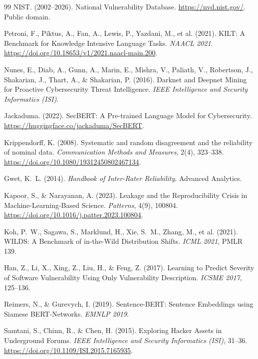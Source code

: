 \documentclass{article}
\begin{document}
\begin{thebibliography}{99}
NIST. (2002--2026). National Vulnerability Database.
\url{https://nvd.nist.gov/}. Public domain.

Petroni, F., Piktus, A., Fan, A., Lewis, P., Yazdani, M., et al.
(2021). KILT: A Benchmark for Knowledge Intensive Language Tasks.
\textit{NAACL 2021}. \url{https://doi.org/10.18653/v1/2021.naacl-main.200}.

Nunes, E., Diab, A., Gunn, A., Marin, E., Mishra, V.,
Paliath, V., Robertson, J., Shakarian, J., Thart, A., \&
Shakarian, P. (2016). Darknet and Deepnet Mining for Proactive
Cybersecurity Threat Intelligence. \textit{IEEE Intelligence and
Security Informatics (ISI)}.

Jackaduma. (2022). SecBERT: A Pre-trained Language Model
for Cybersecurity. \url{https://huggingface.co/jackaduma/SecBERT}.

Krippendorff, K. (2008). Systematic and random disagreement and the
reliability of nominal data. \textit{Communication Methods and Measures},
2(4), 323--338. \url{https://doi.org/10.1080/19312450802467134}.

Gwet, K.\ L. (2014). \textit{Handbook of Inter-Rater Reliability}.
Advanced Analytics.

Kapoor, S., \& Narayanan, A. (2023). Leakage and the Reproducibility
Crisis in Machine-Learning-Based Science. \textit{Patterns}, 4(9),
100804. \url{https://doi.org/10.1016/j.patter.2023.100804}.

Koh, P.\ W., Sagawa, S., Marklund, H., Xie, S.\ M., Zhang, M.,
et al. (2021). WILDS: A Benchmark of in-the-Wild Distribution Shifts.
\textit{ICML 2021}, PMLR 139.

Han, Z., Li, X., Xing, Z., Liu, H., \& Feng, Z. (2017).
Learning to Predict Severity of Software Vulnerability Using Only
Vulnerability Description. \textit{ICSME 2017}, 125--136.

Reimers, N., \& Gurevych, I. (2019). Sentence-BERT:
Sentence Embeddings using Siamese BERT-Networks. \textit{EMNLP 2019}.

Samtani, S., Chinn, R., \& Chen, H. (2015).
Exploring Hacker Assets in Underground Forums.
\textit{IEEE Intelligence and Security Informatics (ISI)}, 31--36.
\url{https://doi.org/10.1109/ISI.2015.7165935}.


\end{thebibliography}
\end{document}
